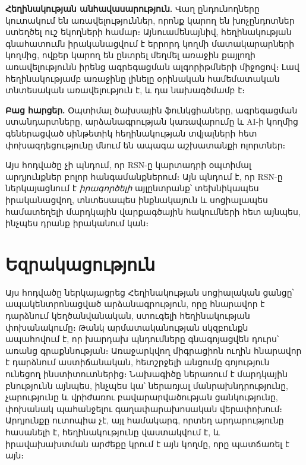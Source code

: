 \documentclass[11pt,a4paper,twocolumn]{article}
\begin{document}
\textbf{Հեղինակության անհավասարություն.} Վաղ ընդունողները կուտակում են առավելություններ, որոնք կարող են խոչընդոտներ ստեղծել ուշ եկողների համար։ Այնուամենայնիվ, հեղինակության գնահատումն իրականացվում է երրորդ կողմի մատակարարների կողմից, ովքեր կարող են ընտրել մեղմել առաջին քայլողի առավելությունն իրենց ագրեգացման ալգորիթմների միջոցով։ Լավ հեղինակությամբ առաջինը լինելը օրինական համեմատական տնտեսական առավելություն է, և դա նախագծմամբ է։

\textbf{Բաց հարցեր.} Օպտիմալ ծախսային ֆունկցիաները, ագրեգացման ստանդարտները, արձանագրության կառավարումը և AI-ի կողմից գեներացված սինթետիկ հեղինակության տվյալների հետ փոխազդեցությունը մնում են ապագա աշխատանքի ոլորտներ։

Այս հոդվածը չի պնդում, որ RSN-ը կարտադրի օպտիմալ արդյունքներ բոլոր հանգամանքներում։ Այն պնդում է, որ RSN-ը ներկայացնում է \emph{իրագործելի} այլընտրանք՝ տեխնիկապես իրականացվող, տնտեսապես ինքնակայուն և սոցիալապես համատեղելի մարդկային վարքագծային հակումների հետ այնպես, ինչպես դրանք իրականում կան։

\section{Եզրակացություն}

Այս հոդվածը ներկայացրեց Հեղինակության սոցիալական ցանցը՝ ապակենտրոնացված արձանագրություն, որը հնարավոր է դարձնում կեղծանվանական, ստուգելի հեղինակության փոխանակումը։ Թանկ արմատականության սկզբունքն ապահովում է, որ խարդախ պնդումները գնագոյացվեն դուրս՝ առանց գրաքննության։ Առաջարկվող միգրացիոն ուղին հնարավոր է դարձնում աստիճանական, հետշրջելի անցումը գոյություն ունեցող ինստիտուտներից։ Նախագիծը ներառում է մարդկային բնությունն այնպես, ինչպես կա՝ ներառյալ մանրախնդրությունը, չարությունը և վրիժառու բավարարվածության ցանկությունը, փոխանակ պահանջելու գաղափարախոսական վերափոխում։ Արդյունքը ուտոպիա չէ, այլ համակարգ, որտեղ արդարությունը հասանելի է, հեղինակությունը վաստակվում է, և իրավախախտման արժեքը կրում է այն կողմը, որը պատճառել է այն։


\end{document}
